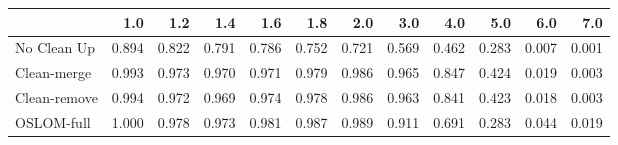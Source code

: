 \begin{tabular}{lrrrrrrrrrrr}
\toprule
{} &   1.0 &   1.2 &   1.4 &   1.6 &   1.8 &   2.0 &   3.0 &   4.0 &   5.0 &   6.0 &   7.0 \\
\midrule
No Clean Up  & 0.894 & 0.822 & 0.791 & 0.786 & 0.752 & 0.721 & 0.569 & 0.462 & 0.283 & 0.007 & 0.001 \\
Clean-merge  & 0.993 & 0.973 & 0.970 & 0.971 & 0.979 & 0.986 & 0.965 & 0.847 & 0.424 & 0.019 & 0.003 \\
Clean-remove & 0.994 & 0.972 & 0.969 & 0.974 & 0.978 & 0.986 & 0.963 & 0.841 & 0.423 & 0.018 & 0.003 \\
OSLOM-full   & 1.000 & 0.978 & 0.973 & 0.981 & 0.987 & 0.989 & 0.911 & 0.691 & 0.283 & 0.044 & 0.019 \\
\bottomrule
\end{tabular}
